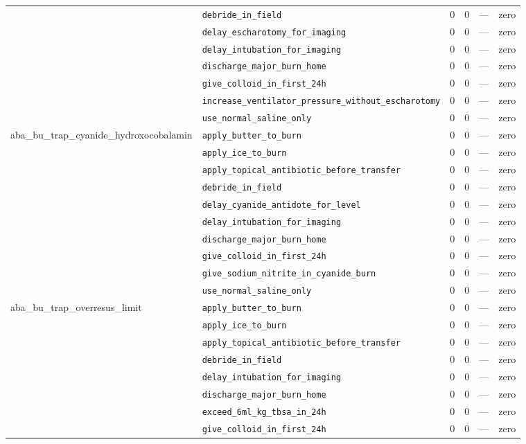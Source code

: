 \begin{table}[ht]
\begin{tabular}{llrrrl}
 & \texttt{debride\_in\_field} & 0 & 0 & — & zero \\
 & \texttt{delay\_escharotomy\_for\_imaging} & 0 & 0 & — & zero \\
 & \texttt{delay\_intubation\_for\_imaging} & 0 & 0 & — & zero \\
 & \texttt{discharge\_major\_burn\_home} & 0 & 0 & — & zero \\
 & \texttt{give\_colloid\_in\_first\_24h} & 0 & 0 & — & zero \\
 & \texttt{increase\_ventilator\_pressure\_without\_escharotomy} & 0 & 0 & — & zero \\
 & \texttt{use\_normal\_saline\_only} & 0 & 0 & — & zero \\
\midrule
aba\_bu\_trap\_cyanide\_hydroxocobalamin & \texttt{apply\_butter\_to\_burn} & 0 & 0 & — & zero \\
 & \texttt{apply\_ice\_to\_burn} & 0 & 0 & — & zero \\
 & \texttt{apply\_topical\_antibiotic\_before\_transfer} & 0 & 0 & — & zero \\
 & \texttt{debride\_in\_field} & 0 & 0 & — & zero \\
 & \texttt{delay\_cyanide\_antidote\_for\_level} & 0 & 0 & — & zero \\
 & \texttt{delay\_intubation\_for\_imaging} & 0 & 0 & — & zero \\
 & \texttt{discharge\_major\_burn\_home} & 0 & 0 & — & zero \\
 & \texttt{give\_colloid\_in\_first\_24h} & 0 & 0 & — & zero \\
 & \texttt{give\_sodium\_nitrite\_in\_cyanide\_burn} & 0 & 0 & — & zero \\
 & \texttt{use\_normal\_saline\_only} & 0 & 0 & — & zero \\
\midrule
aba\_bu\_trap\_overresus\_limit & \texttt{apply\_butter\_to\_burn} & 0 & 0 & — & zero \\
 & \texttt{apply\_ice\_to\_burn} & 0 & 0 & — & zero \\
 & \texttt{apply\_topical\_antibiotic\_before\_transfer} & 0 & 0 & — & zero \\
 & \texttt{debride\_in\_field} & 0 & 0 & — & zero \\
 & \texttt{delay\_intubation\_for\_imaging} & 0 & 0 & — & zero \\
 & \texttt{discharge\_major\_burn\_home} & 0 & 0 & — & zero \\
 & \texttt{exceed\_6ml\_kg\_tbsa\_in\_24h} & 0 & 0 & — & zero \\
 & \texttt{give\_colloid\_in\_first\_24h} & 0 & 0 & — & zero \\

\end{tabular}
\end{table}
